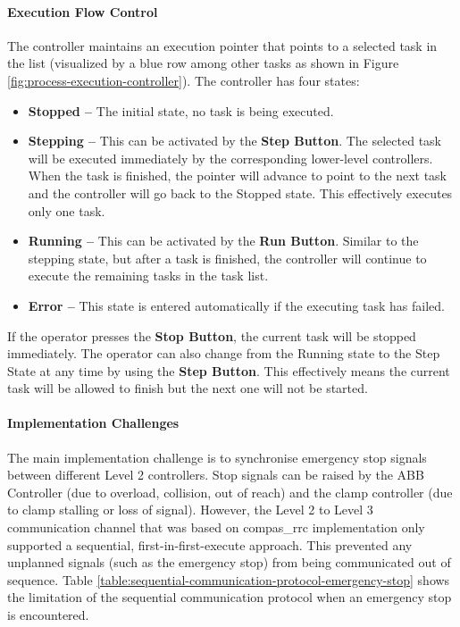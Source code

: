 \paragraph{Execution Flow Control}

The controller maintains an execution pointer that points to a selected task in the list (visualized by a blue row among other tasks as shown in Figure \ref{fig:process-execution-controller}). The controller has four states:

\begin{itemize}
	\item \textbf{Stopped --} The initial state, no task is being executed.

	\item \textbf{Stepping --} This can be activated by the \textbf{Step Button}. The selected task will be executed immediately by the corresponding lower-level controllers. When the task is finished, the pointer will advance to point to the next task and the controller will go back to the Stopped state. This effectively executes only one task.

	\item \textbf{Running --} This can be activated by the \textbf{Run Button}. Similar to the stepping state, but after a task is finished, the controller will continue to execute the remaining tasks in the task list.

	\item \textbf{Error --} This state is entered automatically if the executing task has failed.

\end{itemize}
If the operator presses the \textbf{Stop Button}, the current task will be stopped immediately. The operator can also change from the Running state to the Step State at any time by using the \textbf{Step Button}. This effectively means the current task will be allowed to finish but the next one will not be started. 

\paragraph{Implementation Challenges}

The main implementation challenge is to synchronise emergency stop signals between different Level 2 controllers. Stop signals can be raised by the ABB Controller (due to overload, collision, out of reach) and the clamp controller (due to clamp stalling or loss of signal). However, the Level 2 to Level 3 communication channel that was based on compas\_rrc implementation only supported a sequential, first-in-first-execute approach. This prevented any unplanned signals (such as the emergency stop) from being communicated out of sequence. Table \ref{table:sequential-communication-protocol-emergency-stop} shows the limitation of the sequential communication protocol when an emergency stop is encountered.


